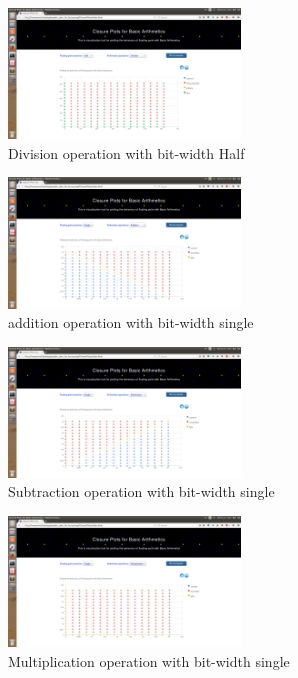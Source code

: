 \documentclass[11pt]{article}
\begin{document}
\begin{figure}[h]
    \centering
    \includegraphics[width=0.55\textwidth]{half-div}
    \caption{Division operation with bit-width Half}
    \label{half-div}
\end{figure}
\begin{figure}[h]
    \centering
    \includegraphics[width=0.55\textwidth]{single-add}
    \caption{addition operation with bit-width single}
    \label{single-add}
\end{figure}
\begin{figure}[h]
    \centering
    \includegraphics[width=0.55\textwidth]{single-sub}
    \caption{Subtraction operation with bit-width single}
    \label{single-sub}
\end{figure}
\begin{figure}[h]
    \centering
    \includegraphics[width=0.55\textwidth]{single-mult}
    \caption{Multiplication operation with bit-width single}
    \label{single-mult}
\end{figure}
\end{document}
